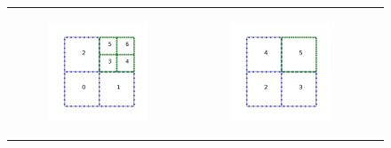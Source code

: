 \begin{figure}
    \centering
    \begin{tabular}{ccc}
        \begin{subfigure}[t]{0.3\textwidth}
            \centering
            \includegraphics[width=\textwidth, clip=true, trim={100 150 100 150}]{../figures/adaptive_merge1.pdf}
        \end{subfigure}
        &
        \begin{subfigure}[t]{0.3\textwidth}
            \centering
            \includegraphics[width=\textwidth, clip=true, trim={100 150 100 150}]{../figures/adaptive_merge2.pdf}

\end{subfigure}
\end{tabular}
\end{figure}
